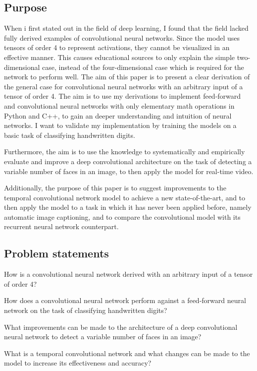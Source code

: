 \documentclass[a4paper, twoside]{article}
\begin{document}
\subsection{Purpose}
When i first stated out in the field of deep learning, I found that the field lacked fully derived examples of convolutional neural networks. Since the model uses tensors of order 4 to represent activations, they cannot be visualized in an effective manner. This causes educational sources to only explain the simple two-dimensional case, instead of the four-dimensional case which is required for the network to perform well. The aim of this paper is to present a clear derivation of the general case for convolutional neural networks with an arbitrary input of a tensor of order 4. The aim is to use my derivations to implement feed-forward and convolutional neural networks with only elementary math operations in Python and C++, to gain an deeper understanding and intuition of neural networks. I want to validate my implementation by training the models on a basic task of classifying handwritten digits.

Furthermore, the aim is to use the knowledge to systematically and empirically evaluate and improve a deep convolutional architecture on the task of detecting a variable number of faces in an image, to then apply the model for real-time video.

Additionally, the purpose of this paper is to suggest improvements to the temporal convolutional network model to achieve a new state-of-the-art, and to then apply the model to a task in which it has never been applied before, namely automatic image captioning, and to compare the convolutional model with its recurrent neural network counterpart.

\subsection{Problem statements}
How is a convolutional neural network derived with an arbitrary input of a tensor of order 4?

How does a convolutional neural network perform against a feed-forward neural network on the task of classifying handwritten digits?

What improvements can be made to the architecture of a deep convolutional neural network to detect a variable number of faces in an image?

What is a temporal convolutional network and what changes can be made to the model to increase its effectiveness and accuracy?
\end{document}
